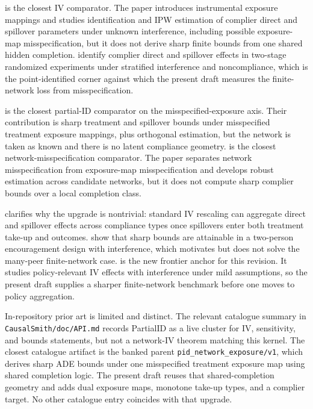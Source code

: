\documentclass[11pt]{article}
\theoremstyle{definition}
\theoremstyle{plain}
\theoremstyle{remark}
\begin{document}
\citet{HoshinoYanagi2024} is the closest IV comparator. The paper introduces
instrumental exposure mappings and studies identification and IPW estimation of
complier direct and spillover parameters under unknown interference, including
possible exposure-map misspecification, but it does not derive sharp finite
bounds from one shared hidden completion. \citet{ImaiJiangMalani2021} identify
complier direct and spillover effects in two-stage randomized experiments under
stratified interference and noncompliance, which is the point-identified corner
against which the present draft measures the finite-network loss from
misspecification.

\citet{SchroderOprescuFeuerriegelKallus2026} is the closest partial-ID
comparator on the misspecified-exposure axis. Their contribution is sharp
treatment and spillover bounds under misspecified treatment exposure mappings,
plus orthogonal estimation, but the network is taken as known and there is no
latent compliance geometry. \citet{WeinsteinNevo2026} is the closest
network-misspecification comparator. The paper separates network
misspecification from exposure-map misspecification and develops robust
estimation across candidate networks, but it does not compute sharp complier
bounds over a local completion class.

\citet{VazquezBare2023} clarifies why the upgrade is nontrivial: standard IV
rescaling can aggregate direct and spillover effects across compliance types
once spillovers enter both treatment take-up and outcomes. \citet{AcerenzaMartinezIriarteSanchezBecerraSpini2025}
show that sharp bounds are attainable in a two-person encouragement design with
interference, which motivates but does not solve the many-peer finite-network
case. \citet{NibberingOosterveen2025} is the new frontier anchor for this
revision. It studies policy-relevant IV effects with interference under mild
assumptions, so the present draft supplies a sharper finite-network benchmark
before one moves to policy aggregation.

In-repository prior art is limited and distinct. The relevant catalogue summary
in \texttt{CausalSmith/doc/API.md} records PartialID as a live cluster for IV,
sensitivity, and bounds statements, but not a network-IV theorem matching this
kernel. The closest catalogue artifact is the banked parent
\texttt{pid\_network\_exposure/v1}, which derives sharp ADE bounds under one
misspecified treatment exposure map using shared completion logic. The present
draft reuses that shared-completion geometry and adds dual exposure maps,
monotone take-up types, and a complier target. No other catalogue entry
coincides with that upgrade.
\end{document}
